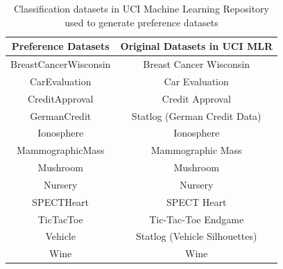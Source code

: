
\begin{table}
        \centering
        \small
        \begin{tabular}{ |c||c| }
                \hline
                Preference Datasets    & Original Datasets in UCI MLR \\
                \hline \hline
                BreastCancerWisconsin  & Breast Cancer Wisconsin \\
                \hline
                CarEvaluation          & Car Evaluation \\
                \hline
                CreditApproval         & Credit Approval \\
                \hline
                GermanCredit           & Statlog (German Credit Data) \\
                \hline
                Ionosphere             & Ionosphere \\
                \hline
                MammographicMass       & Mammographic Mass \\
                \hline
                Mushroom               & Mushroom \\
                \hline
                Nursery                & Nursery \\
                \hline
                SPECTHeart             & SPECT Heart \\
                \hline
                TicTacToe              & Tic-Tac-Toe Endgame \\
                \hline
                Vehicle                & Statlog (Vehicle Silhouettes) \\
                \hline
                Wine                   & Wine \\
                \hline
        \end{tabular}
        \caption{Classification datasets in UCI Machine Learning Repository 
								 used to generate preference datasets}
        \label{tbl:class}
\end{table}



